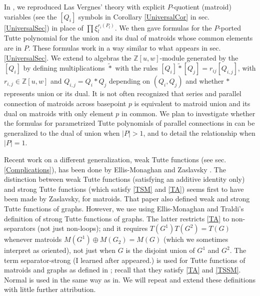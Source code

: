 \documentclass[12pt,leqno]{amsart}
\theoremstyle{remark}
\begin{document}
In \cite{sdcPorted}, we
reproduced Las Vergnes' theory with explicit $P$-quotient (matroid)
variables (see the $[Q_i]$ symbols in Corollary \ref{UniversalCor}
in sec. \ref{UniversalSec}) in place of 
$\prod\xi_l^{r_i(P_l)}$.  We then
gave formulas for the $P$-ported Tutte polynomial for the
union and its dual of matroids whose common elements are in $P$.
These formulas  work in a way similar to what appears in
sec. \ref{UniversalSec}.
We extend to algebras
the $\mathbb{Z}[u,w]$-module
generated by the $[Q_i]$ by defining multiplications 
$\tilde{*}$ with the rules
$[Q_i]\tilde{*}[Q_j]=r_{ij}[Q_{i,j}]$, with $r_{i,j}\in\mathbb{Z}[u,w]$ and
$Q_{i,j}=Q_i*Q_j$ depending on $(Q_i,Q_j)$ and whether $*$ represents 
union or its dual.  It is not often recognized that series and parallel
connection of matroids across basepoint $p$ 
is equivalent to matroid union and its dual on matroids with only
element $p$ in common.  We plan to investigate whether the formulas
for parametrized Tutte polynomials of parallel connections
in \cite{Ellis-Monaghan-Traldi} can be generalized to the dual
of union when $|P|>1$, and to detail the relationship when $|P|=1$.



Recent work on a different generalization, weak Tutte functions
(see sec. \ref{Complications}), has been done by 
Ellis-Monaghan and Zaslavsky \cite{ZaslavskyOct18}.
The distinction between weak Tutte functions (satisfying
an additive identity only)
and strong Tutte functions
(which satisfy \eqref{TSM} and \eqref{TA}) seems first to
have been made by Zaslavsky\cite{MR93a:05047}, for matroids.
That paper also defined weak and strong Tutte functions of
graphs.  However, we use using Ellis-Monaghan and Traldi's
definition of strong Tutte functions of 
graphs\cite{Ellis-Monaghan-Traldi}.
The latter restricts \eqref{TA} to non-separators (not just 
non-loops);  and it 
requires $T(G^1)T(G^2)=T(G)$ whenever 
matroids $M(G^1)\oplus M(G_2)=M(G)$ 
(which we sometimes interpret as oriented), not just when
$G$ is the disjoint union of $G^1$ and $G^2$.
The term separator-strong 
(I learned\cite{JoAndTom} 
after \cite{Ellis-Monaghan-Traldi} appeared.)
is used for Tutte functions of matroids and graphs 
as defined in \cite{Ellis-Monaghan-Traldi}; recall that
they satisfy \eqref{TA} and \eqref{TSSM}.
Normal is used in the same way as in\cite{MR93a:05047}.
We will repeat and extend these definitions with
little further attribution.
\end{document}
